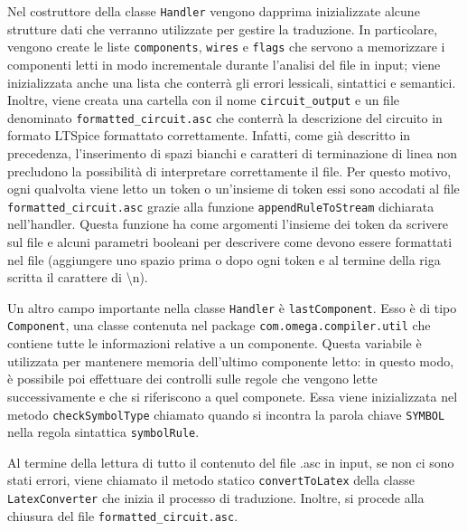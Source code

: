 \noindent
Nel costruttore della classe \texttt{Handler} vengono dapprima inizializzate alcune strutture dati che verranno utilizzate per gestire la traduzione. In particolare, vengono create le liste \texttt{components}, \texttt{wires} e \texttt{flags} che servono a memorizzare i componenti letti in modo incrementale durante l'analisi del file in input; viene inizializzata anche una lista che conterrà gli errori lessicali, sintattici e semantici. Inoltre, viene creata una cartella con il nome \texttt{circuit\_output} e un file denominato \texttt{formatted\_circuit.asc} che conterrà la descrizione del circuito in formato LTSpice formattato correttamente. Infatti, come già descritto in precedenza, l'inserimento di spazi bianchi e caratteri di terminazione di linea non precludono la possibilità di interpretare correttamente il file. Per questo motivo, ogni qualvolta viene letto un token o un'insieme di token essi sono accodati al file \texttt{formatted\_circuit.asc} grazie alla funzione \texttt{appendRuleToStream} dichiarata nell'handler. Questa funzione ha come argomenti l'insieme dei token da scrivere sul file e alcuni parametri booleani per descrivere come devono essere formattati nel file (aggiungere uno spazio prima o dopo ogni token e al termine della riga scritta il carattere di \textbackslash n). 

\noindent
Un altro campo importante nella classe \texttt{Handler} è \texttt{lastComponent}. Esso è di tipo \texttt{Component}, una classe contenuta nel package \texttt{com.omega.compiler.util} che contiene tutte le informazioni relative a un componente. Questa variabile è utilizzata per mantenere memoria dell'ultimo componente letto: in questo modo, è possibile poi effettuare dei controlli sulle regole che vengono lette successivamente e che si riferiscono a quel componete. Essa viene inizializzata nel metodo \texttt{checkSymbolType} chiamato quando si incontra la parola chiave \texttt{SYMBOL} nella regola sintattica \texttt{symbolRule}.

\noindent
Al termine della lettura di tutto il contenuto del file .asc in input, se non ci sono stati errori, viene chiamato il metodo statico \texttt{convertToLatex} della classe \texttt{LatexConverter} che inizia il processo di traduzione. Inoltre, si procede alla chiusura del file \texttt{formatted\_circuit.asc}.

